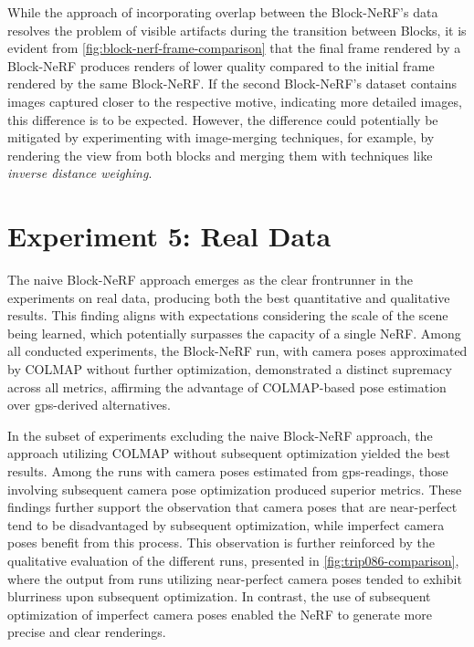 While the approach of incorporating overlap between the Block-NeRF's data resolves the problem of visible artifacts during the transition between Blocks, it is evident from \autoref{fig:block-nerf-frame-comparison} that the final frame rendered by a Block-NeRF produces renders of lower quality compared to the initial frame rendered by the same Block-NeRF. If the second Block-NeRF's dataset contains images captured closer to the respective motive, indicating more detailed images, this difference is to be expected. However, the difference could potentially be mitigated by experimenting with image-merging techniques, for example, by rendering the view from both blocks and merging them with techniques like \textit{inverse distance weighing}.




\section{Experiment 5: Real Data}
The naive Block-NeRF approach emerges as the clear frontrunner in the experiments on real data, producing both the best quantitative and qualitative results. This finding aligns with expectations considering the scale of the scene being learned, which potentially surpasses the capacity of a single NeRF. Among all conducted experiments, the Block-NeRF run, with camera poses approximated by COLMAP without further optimization, demonstrated a distinct supremacy across all metrics, affirming the advantage of COLMAP-based pose estimation over \acrshort{gps}-derived alternatives.

In the subset of experiments excluding the naive Block-NeRF approach, the approach utilizing COLMAP without subsequent optimization yielded the best results. Among the runs with camera poses estimated from \acrshort{gps}-readings, those involving subsequent camera pose optimization produced superior metrics. These findings further support the observation that camera poses that are near-perfect tend to be disadvantaged by subsequent optimization, while imperfect camera poses benefit from this process. This observation is further reinforced by the qualitative evaluation of the different runs, presented in \autoref{fig:trip086-comparison}, where the output from runs utilizing near-perfect camera poses tended to exhibit blurriness upon subsequent optimization. In contrast, the use of subsequent optimization of imperfect camera poses enabled the NeRF to generate more precise and clear renderings.



